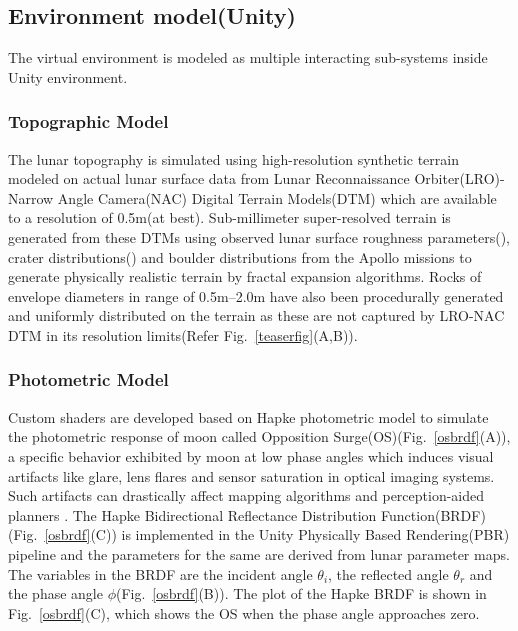 \documentclass[a4paper, 10pt, conference]{ieeeconf}      %
\begin{document}
\subsection{Environment model(Unity)}
The virtual environment is modeled as multiple interacting sub-systems inside Unity environment.
\subsubsection{Topographic Model}
The lunar topography is simulated using high-resolution synthetic terrain modeled on actual lunar surface data from Lunar Reconnaissance Orbiter(LRO)-Narrow Angle Camera(NAC) Digital Terrain Models(DTM) which are available to a resolution of 0.5m(at best). Sub-millimeter super-resolved terrain is generated from these DTMs using observed lunar surface roughness parameters(\cite{manned1971analysis,rowan1971lunar}), crater distributions(\cite{neukum1975study,heiken1991lunar}) and boulder distributions \cite{watkins2018boulder} from the Apollo missions to generate physically realistic terrain by fractal expansion algorithms. Rocks of envelope diameters in range of 0.5m--2.0m have also been procedurally generated and uniformly distributed on the terrain as these are not captured by LRO-NAC DTM in its resolution limits(Refer Fig.~\ref{teaserfig}(A,B)).
\subsubsection{Photometric Model}
Custom shaders are developed based on Hapke photometric model\cite{hapke2012theory} to simulate the photometric response of moon called Opposition Surge(OS)\cite{gehrels1964wavelength}(Fig.~\ref{osbrdf}(A)), a specific behavior exhibited by moon at low phase angles which induces visual artifacts like glare, lens flares and sensor saturation in optical imaging systems. Such artifacts can drastically affect mapping algorithms and perception-aided planners \cite{otsu2017look}. The Hapke Bidirectional Reflectance Distribution Function(BRDF)(Fig.~\ref{osbrdf}(C)) is implemented in the Unity Physically Based Rendering(PBR) pipeline\cite{pranckevivcius2014physically} and the parameters for the same are derived from lunar parameter maps\cite{sato2014resolved}. The variables in the BRDF are the incident angle $\theta_i$, the reflected angle $\theta_r$ and the phase angle $\phi$(Fig.~\ref{osbrdf}(B)). The plot of the Hapke BRDF is shown in Fig.~\ref{osbrdf}(C), which shows the OS when the phase angle approaches zero.
\end{document}
